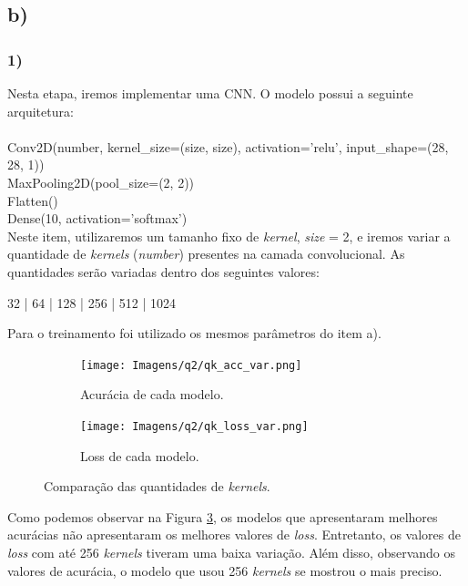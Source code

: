 \documentclass[12pt]{article}
\begin{document}
\subsection*{b)}

\subsubsection*{1)}

Nesta etapa, iremos implementar uma CNN. O modelo possui a seguinte arquitetura:\\
\\
Conv2D(\color{red}number\color{black}, kernel\_size=(\color{red}size\color{black}, \color{red}size\color{black}), activation='relu', input\_shape=(28, 28, 1))\\
MaxPooling2D(pool\_size=(2, 2))\\
Flatten()\\
Dense(10, activation='softmax') \\

Neste item, utilizaremos um tamanho fixo de \textit{kernel}, \textit{size} = 2, e iremos variar a quantidade de \textit{kernels} (\textit{number}) presentes na camada convolucional. As quantidades serão variadas dentro dos seguintes valores:

\begin{center}
	32 | 64 | 128 | 256 | 512 | 1024
\end{center}

Para o treinamento foi utilizado os mesmos parâmetros do item a).

\begin{figure}[H]
	\centering
	\begin{subfigure}{0.65\linewidth}
		\centering
		\texttt{[image: Imagens/q2/qk\_acc\_var.png]}
		\caption{Acurácia de cada modelo.}
		\label{fig:qk_acc_var}
	\end{subfigure}

	\begin{subfigure}{0.65\linewidth}
		\centering
		\texttt{[image: Imagens/q2/qk\_loss\_var.png]}
		\caption{Loss de cada modelo.}
		\label{fig:qk_loss_var}
	\end{subfigure}
	\caption{Comparação das quantidades de \textit{kernels}.}
	\label{fig:comp_k}
\end{figure}

Como podemos observar na Figura \ref{fig:comp_k}, os modelos que apresentaram melhores acurácias não apresentaram os melhores valores de \textit{loss}. Entretanto, os valores de \textit{loss} com até 256 \textit{kernels} tiveram uma baixa variação. Além disso, observando os valores de acurácia, o modelo que usou 256 \textit{kernels} se mostrou o mais preciso.
\end{document}
